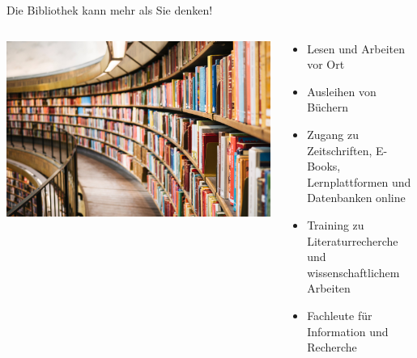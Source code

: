 \documentclass{beamer}
\begin{document}
\begin{frame}{Die Bibliothek kann mehr als Sie denken!}

\begin{columns}[c]
    \begin{column}{5cm}
    \begin{center}
    \includegraphics[width=\textwidth]{susan-q-yin-2JIvboGLeho-unsplash.jpg}
\end{center}

    \end{column}
        \begin{column}{7cm}
\begin{itemize}
    \item 
Lesen und Arbeiten vor Ort
\item 
Ausleihen von Büchern
\item 
    Zugang zu Zeitschriften, E-Books, Lernplattformen und Datenbanken online
    \item 
    Training zu Literaturrecherche und wissenschaftlichem Arbeiten
    \item 
    Fachleute für Information und Recherche
\end{itemize}
        
    \end{column}

\end{columns}

\end{frame}
\end{document}
